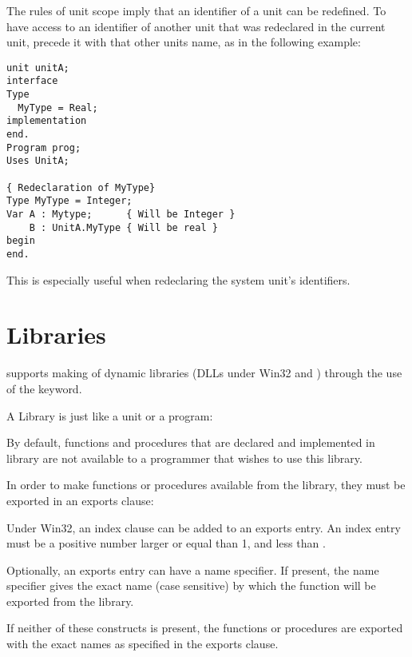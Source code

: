 The rules of unit scope imply that an identifier of a unit can be redefined.
To have access to an identifier of another unit that was redeclared in
the current unit, precede it with that other units name, as in the following
example:
\begin{verbatim}
unit unitA;
interface
Type
  MyType = Real;
implementation
end.
Program prog;
Uses UnitA;

{ Redeclaration of MyType}
Type MyType = Integer;
Var A : Mytype;      { Will be Integer }
    B : UnitA.MyType { Will be real }
begin
end.
\end{verbatim}
This is especially useful when redeclaring the system unit's identifiers.

\section{Libraries}
 

\fpc supports making of dynamic libraries (DLLs under Win32 and \ostwo) through
the use of the  keyword.

A Library is just like a unit or a program:


By default, functions and procedures that are declared and implemented in
library are not available to a programmer that wishes to use this library.

In order to make functions or procedures available from the library,
they must be exported in an exports clause:



Under Win32, an index clause can be added to an exports entry.
An index entry must be a positive number larger or equal than 1, and less
than .

Optionally, an exports entry can have a name specifier. If present, the name
specifier gives the exact name (case sensitive) by which the function will
be exported from the library.

If neither of these constructs is present, the functions or procedures
are exported with the exact names as specified in the exports clause.

